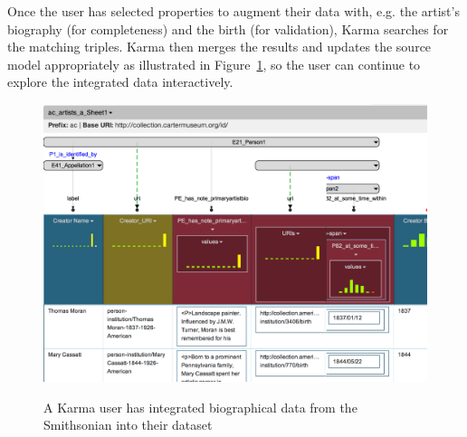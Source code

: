 Once the user has selected properties to augment their data with, e.g. the artist's biography (for completeness) and the birth (for validation), Karma searches for the matching triples.
Karma then merges the results and updates the source model appropriately as illustrated in Figure~\ref{fig:augment-screenshot}, so the user can continue to explore the integrated data interactively. 

\begin{figure}
\begin{center}
\includegraphics[width=4.9in]{images/6-augment.png}
\vspace{-3mm}
\caption{A Karma user has integrated biographical data from the Smithsonian into their dataset}
\vspace{-2mm}
\label{fig:augment-screenshot}
\end{center}
\vspace{-1.5em}
\end{figure}

